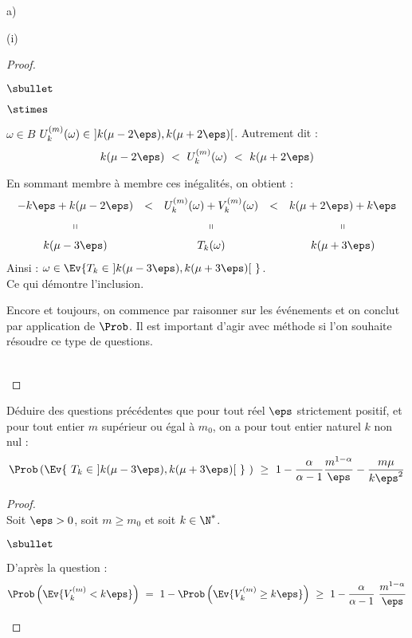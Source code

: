 \documentclass[11pt]{article}%
\begin{document}
\begin{liste}{a)}
\begin{nonoliste}{(i)}
\begin{proof}
\begin{noliste}{$\sbullet$}
\begin{noliste}{$\stimes$}
        \item $\omega \in B$ \ie $U_{k}^{(m)}(\omega) \in \ ] k(\mu -
          2 \eps), k(\mu + 2 \eps)[ $. Autrement dit :
          \[
          k(\mu - 2 \eps) \ < \ U_{k}^{(m)}(\omega) \ < \ k(\mu + 2
          \eps)
          \]
        \end{noliste}
        En sommant membre à membre ces inégalités, on obtient :
        \[
        \begin{array}{ccccc}
          - k\eps + k(\mu - 2 \eps) & < & U_{k}^{(m)}(\omega) +
          V_{k}^{(m)}(\omega) & < & k(\mu + 2 \eps) + k\eps
          \\[.2cm]
          \shortparallel & & \shortparallel & & \shortparallel
          \\[.2cm]
          k(\mu - 3 \eps) & & T_k(\omega) & & k(\mu + 3 \eps)
        \end{array}
        \]
        Ainsi : $\omega \in \Ev{T_k \in \ ]k(\mu - 3 \eps), k(\mu + 3
          \eps)[ \ }$.\\
        Ce qui démontre l'inclusion.
      \end{noliste}
      \conc{On a donc bien : $\Prob(\Ev{ T_{k} \in \ ]k(\mu - 3 \eps),
          k(\mu + 3 \eps)[ \ }) \ \geq \ \Prob(A \cap B) \ \geq \
        \Prob(A) + \Prob(B) - 1$.}%
      \begin{remark}%
        Encore et toujours, on commence par raisonner sur les
        événements et on conclut par application de $\Prob$. Il est
        important d'agir avec méthode si l'on souhaite résoudre ce
        type de questions.
      \end{remark}~\\[-1.4cm]
    \end{proof}


    \newpage


  \item Déduire des questions précédentes que pour tout réel $\eps$
    strictement positif, et pour tout entier $m$ supérieur ou égal à
    $m_{0}$, on a pour tout entier naturel $k$ non nul :
    \[
    \Prob\left(\Ev{\ T_{k} \in \ ]k(\mu - 3 \eps), k(\mu + 3 \eps)[ \
      } \ \right) \ \geq \ 1 - \dfrac{\alpha}{\alpha-1}
    \dfrac{m^{1-\alpha}}{\eps} - \dfrac{m \mu}{k \eps^{2}}
    \]

    \begin{proof}~\\%
      Soit $\eps > 0$, soit $m \geq m_0$ et soit $k \in \N^*$.
      \begin{noliste}{$\sbullet$}
      \item D'après la question \itbf{9.f)ii.} :
        \[
        \Prob\left(\Ev{ V_{k}^{(m)} < k \eps}\right) \ = \ 1 -
        \Prob\left(\Ev{ V_{k}^{(m)} \geq k \eps } \right) \ \geq \ 1 -
        \dfrac{\alpha}{\alpha-1} \ \dfrac{m^{1-\alpha}}{\eps}
        \]


\end{noliste}
\end{proof}
\end{nonoliste}
\end{liste}
\end{document}
